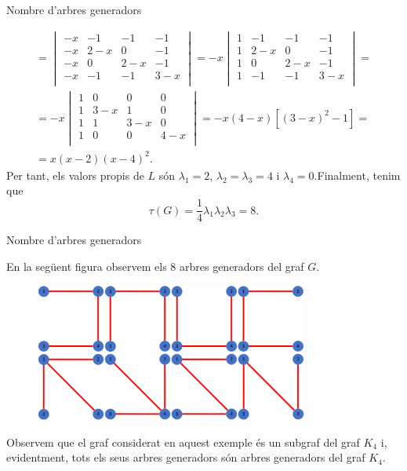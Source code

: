 \documentclass{beamer}
\begin{document}
\begin{frame}{Nombre d'arbres generadors}
    \begin{exampleblock}{}
        \begin{multline*}
            =\begin{vmatrix}
                -x & -1  & -1  & -1  \\
                -x & 2-x & 0   & -1  \\
                -x & 0   & 2-x & -1  \\
                -x & -1  & -1  & 3-x \\
            \end{vmatrix}=-x\begin{vmatrix}
                1 & -1  & -1  & -1  \\
                1 & 2-x & 0   & -1  \\
                1 & 0   & 2-x & -1  \\
                1 & -1  & -1  & 3-x \\
            \end{vmatrix}=\\=-x\begin{vmatrix}
                1 & 0   & 0   & 0   \\
                1 & 3-x & 1   & 0   \\
                1 & 1   & 3-x & 0   \\
                1 & 0   & 0   & 4-x \\
            \end{vmatrix}=-x(4-x)[(3-x)^2-1]=\\=x(x-2)(x-4)^2.
        \end{multline*}\pause
        Per tant, els valors propis de $L$ són $\lambda_1=2$, $\lambda_2=\lambda_3=4$ i $\lambda_4=0$.\pause\space  Finalment, tenim que $$\tau(G)=\frac{1}{4}\lambda_1\lambda_2\lambda_3=8.$$
    \end{exampleblock}
\end{frame}
\begin{frame}{Nombre d'arbres generadors}
    \begin{exampleblock}{}
        En la següent figura observem els 8 arbres generadors del graf $G$.
        \begin{figure}[ht]
            \centering
            \includegraphics[width=9cm]{Imatges/graf1_8.jpg}
        \end{figure}\pause
        Observem que el graf considerat en aquest exemple és un subgraf del graf $K_4$ i, evidentment, tots els seus arbres generadors són arbres generadors del graf $K_4$.
    \end{exampleblock}
\end{frame}
\end{document}
